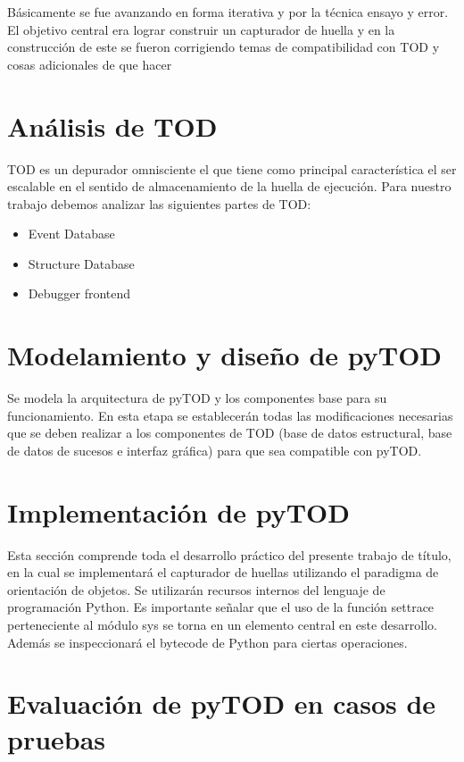 \documentclass[12pt,legalpaper]{report}
\begin{document}
Básicamente se fue avanzando en forma iterativa y por la técnica ensayo y error.  El objetivo central era lograr construir un capturador de huella y en la construcción de este se fueron corrigiendo temas de compatibilidad con TOD y cosas adicionales de que hacer 

	\section{Análisis de TOD}

TOD es un depurador omnisciente el que tiene como principal característica el ser escalable en el sentido de almacenamiento de la huella de ejecución.  Para nuestro trabajo debemos analizar las siguientes partes de TOD:

\begin{itemize}
	\item Event Database
    \item Structure Database
    \item Debugger frontend
\end{itemize}

	\section{Modelamiento y diseño de pyTOD}

    Se modela la arquitectura de pyTOD y los componentes base para su funcionamiento.  En esta etapa se establecerán todas las modificaciones necesarias que se deben realizar a los componentes de TOD (base de datos estructural, base de datos de sucesos e interfaz gráfica) para que sea compatible con pyTOD.

	\section{Implementación de pyTOD}

    Esta sección comprende toda el desarrollo práctico del presente trabajo de título, en la cual se implementará el capturador de huellas utilizando el paradigma de orientación de objetos.  Se utilizarán recursos internos del lenguaje de programación Python.  Es importante señalar que el uso de la función settrace perteneciente al módulo sys se torna en un elemento central en este desarrollo.  Además se inspeccionará el bytecode de Python para ciertas operaciones.

	\section{Evaluación de pyTOD en casos de pruebas}
\end{document}
